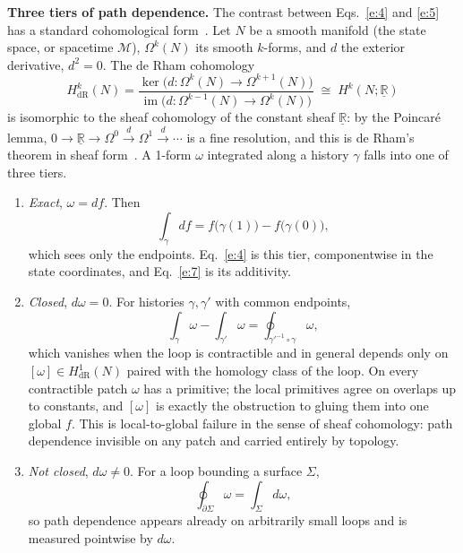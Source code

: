 \documentclass[10pt]{article}
\begin{document}
\smallskip
\noindent\textbf{Three tiers of path dependence.} The contrast between Eqs.~\eqref{e:4} and \eqref{e:5} has a standard cohomological form~\cite{botttu}. Let $N$ be a smooth manifold (the state space, or spacetime $\mathcal M$), $\Omega^k(N)$ its smooth $k$-forms, and $d$ the exterior derivative, $d^2=0$. The de Rham cohomology
\begin{equation}
H^k_{\mathrm{dR}}(N)=\frac{\ker\bigl(d:\Omega^k(N)\to\Omega^{k+1}(N)\bigr)}{\operatorname{im}\bigl(d:\Omega^{k-1}(N)\to\Omega^k(N)\bigr)}\;\cong\;H^k(N;\underline{\mathbb R})\tag{8a}\label{e:8a}
\end{equation}
is isomorphic to the sheaf cohomology of the constant sheaf $\underline{\mathbb R}$: by the Poincar\'e lemma, $0\to\underline{\mathbb R}\to\Omega^0\xrightarrow{d}\Omega^1\xrightarrow{d}\cdots$ is a fine resolution, and this is de Rham's theorem in sheaf form~\cite{botttu}. A 1-form $\omega$ integrated along a history $\gamma$ falls into one of three tiers.
\begin{enumerate}\itemsep1pt
\item \emph{Exact}, $\omega=df$. Then
\begin{equation}
\int_\gamma df=f\bigl(\gamma(1)\bigr)-f\bigl(\gamma(0)\bigr),\tag{8b}\label{e:8b}
\end{equation}
which sees only the endpoints. Eq.~\eqref{e:4} is this tier, componentwise in the state coordinates, and Eq.~\eqref{e:7} is its additivity.
\item \emph{Closed}, $d\omega=0$. For histories $\gamma,\gamma'$ with common endpoints,
\begin{equation}
\int_\gamma\omega-\int_{\gamma'}\omega=\oint_{\gamma'^{-1}\circ\gamma}\omega,\tag{8c}\label{e:8c}
\end{equation}
which vanishes when the loop is contractible and in general depends only on $[\omega]\in H^1_{\mathrm{dR}}(N)$ paired with the homology class of the loop. On every contractible patch $\omega$ has a primitive; the local primitives agree on overlaps up to constants, and $[\omega]$ is exactly the obstruction to gluing them into one global $f$. This is local-to-global failure in the sense of sheaf cohomology: path dependence invisible on any patch and carried entirely by topology.
\item \emph{Not closed}, $d\omega\ne0$. For a loop bounding a surface $\Sigma$,
\begin{equation}
\oint_{\partial\Sigma}\omega=\int_\Sigma d\omega,\tag{8d}\label{e:8d}
\end{equation}
so path dependence appears already on arbitrarily small loops and is measured pointwise by $d\omega$.
\end{enumerate}
\end{document}
